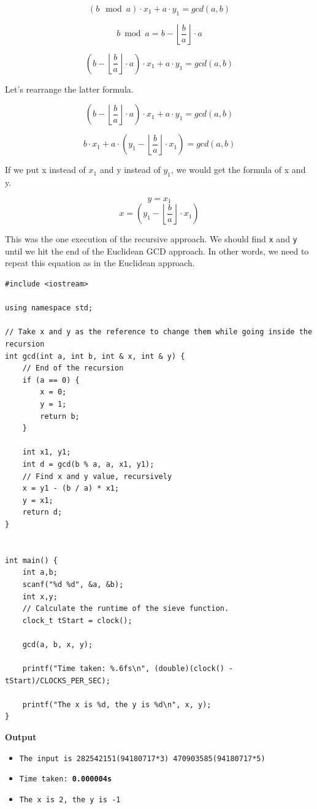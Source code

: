 \documentclass[12pt]{article}
\begin{document}
\[ (b \mod a) \cdot x_1 + a \cdot y_1 = gcd(a,b) \]

\[ b \bmod a = b - \left\lfloor \frac{b}{a} \right\rfloor \cdot a\]

\[(b - \left\lfloor \frac{b}{a} \right\rfloor \cdot a) \cdot x_1 + a \cdot y_1 = gcd(a,b) \]

Let's rearrange the latter formula.

\[(b - \left\lfloor \frac{b}{a} \right\rfloor \cdot a) \cdot x_1 + a \cdot y_1 = gcd(a,b) \]

\[b \cdot x_1 + a \cdot \left( y_1 - \left\lfloor \frac{b}{a} \right\rfloor \cdot x_1 \right) = gcd(a,b) \]

If we put x instead of $x_1$ and y instead of $y_1$, we would get the formula of x and y.

\[ y = x_1 \]
\[ x = \left( y_1 - \left\lfloor \frac{b}{a} \right\rfloor \cdot x_1 \right) \]

This was the one execution of the recursive approach. We should find \texttt{x} and \texttt{y} until we hit the end of the Euclidean GCD approach. In other words, we need to repeat this equation as in the Euclidean approach.
\clearpage

\begin{verbatim}
#include <iostream>

using namespace std;

// Take x and y as the reference to change them while going inside the recursion
int gcd(int a, int b, int & x, int & y) {
    // End of the recursion
    if (a == 0) {
        x = 0;
        y = 1;
        return b;
    }
    
    int x1, y1;
    int d = gcd(b % a, a, x1, y1);
    // Find x and y value, recursively
    x = y1 - (b / a) * x1;
    y = x1;
    return d;
}


int main() {
    int a,b;
    scanf("%d %d", &a, &b);
    int x,y;
    // Calculate the runtime of the sieve function.
    clock_t tStart = clock();
    
    gcd(a, b, x, y);
    
    printf("Time taken: %.6fs\n", (double)(clock() - tStart)/CLOCKS_PER_SEC);
    
    printf("The x is %d, the y is %d\n", x, y);
}

\end{verbatim}
\textbf{Output}

\begin{itemize}
  \item \texttt{The input is 282542151(94180717*3) 470903585(94180717*5)} 
  \item \texttt{Time taken: \textbf{0.000004s}} 
  \item \texttt{The x is 2, the y is -1}
\end{itemize}
\end{document}
